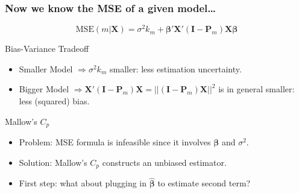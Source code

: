 \begin{frame}
  \frametitle{Now we know the MSE of a given model\dots}
  
  \[\text{MSE}(m|\mathbf{X}) = \sigma^2 k_m + \boldsymbol{\beta}'\mathbf{X}'(\mathbf{I} - \mathbf{P}_m)\mathbf{X}\boldsymbol{\beta}\]

\begin{block}{Bias-Variance Tradeoff}
  \pause
  \begin{itemize}
    \item Smaller Model $\Rightarrow \sigma^2 k_m$ smaller: less estimation uncertainty. \pause
    \item Bigger Model $\Rightarrow \mathbf{X}'(\mathbf{I} - \mathbf{P}_m)\mathbf{X} = \left|\left|(\mathbf{I} - \mathbf{P}_m)\mathbf{X} \right|\right|^2$ is in general smaller: less (squared) bias.
  \end{itemize}
\end{block}

\vspace{-1em}

\pause
\begin{alertblock}{Mallow's $C_p$}
  \begin{itemize}
    \item Problem: MSE formula is infeasible since it involves $\boldsymbol{\beta}$ and $\sigma^2$.\pause
    \item Solution: Mallow's $C_p$ constructs an unbiased estimator.
    \item First step: what about plugging in $\widehat{\boldsymbol{\beta}}$ to estimate second term?
  \end{itemize}
\end{alertblock}

\end{frame}
